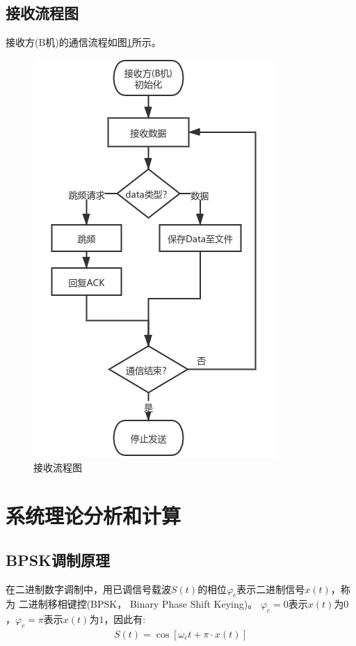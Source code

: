\documentclass[12pt]{ctexart}
\begin{document}
\subsection{接收流程图}
	接收方(B机)的通信流程如图\ref{rcv-routine}所示。
\begin{figure}[htbp]
	\centering
 	\includegraphics[scale=0.6]{../figures/rcv-routine.png}
	\caption{接收流程图}
	\label{rcv-routine}
\end{figure}


\section{系统理论分析和计算}

\subsection{BPSK调制原理}

	在二进制数字调制中，用已调信号载波$S(t)$的相位$\varphi_c$表示二进制信号$x(t)$，称为
二进制移相键控(BPSK， Binary Phase Shift Keying)。
$\varphi_c = 0$表示$x(t)$为$0$，$\varphi_c = \pi$表示$x(t)$为$1$，因此有:
\begin{align}
	S(t) = \cos[\omega_c t + \pi \cdot x(t)]
	\label{eq-1}
\end{align}
\end{document}

